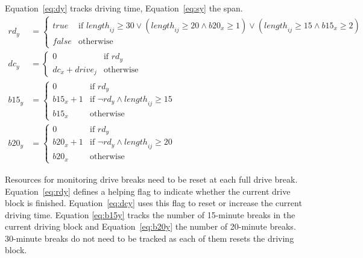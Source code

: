 \documentclass[]{amsart}
\theoremstyle{plain}
\begin{document}
\noindent
Equation~\eqref{eq:dy} tracks driving time, Equation~\eqref{eq:sy} the span.
{\small
\begin{align}
    \label{eq:rdy}
    \mathit{rd}_y &= \begin{cases}\mathit{true} & \text{if }\mathit{length}_{ij}\geq30\lor (\mathit{length}_{ij}\geq20\land\mathit{b20}_x\geq1)\lor (\mathit{length}_{ij}\geq15\land\mathit{b15}_x\geq2)\\
    \mathit{false} & \text{otherwise}
    \end{cases}
    \\
    \label{eq:dcy}
    \mathit{dc}_y &= \begin{cases}0 & \text{if }\mathit{rd}_y\\
    \mathit{dc}_x+\mathit{drive}_j & \text{otherwise}
    \end{cases}
    \\
    \label{eq:b15y}
    \mathit{b15}_y &= \begin{cases}0 & \text{if }\mathit{rd}_y\\
    \mathit{b15}_x+1 & \text{if }\neg\mathit{rd}_y\land\mathit{length}_{ij}\geq15\\
    \mathit{b15}_x & \text{otherwise}
    \end{cases}
    \\
    \label{eq:b20y}
    \mathit{b20}_y &= \begin{cases}0 & \text{if }\mathit{rd}_y\\
    \mathit{b20}_x+1 & \text{if }\neg\mathit{rd}_y\land\mathit{length}_{ij}\geq20\\
    \mathit{b20}_x & \text{otherwise}
    \end{cases}
\end{align}
}%

\noindent
Resources for monitoring drive breaks need to be reset at each full drive break. Equation~\eqref{eq:rdy} defines a helping flag to indicate whether the current drive block is finished. Equation~\eqref{eq:dcy} uses this flag to reset or increase the current driving time. Equation \eqref{eq:b15y} tracks the number of 15-minute breaks in the current driving block and Equation~\eqref{eq:b20y} the number of 20-minute breaks. 30-minute breaks do not need to be tracked as each of them resets the driving block.
\end{document}
